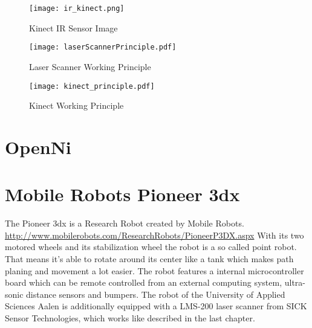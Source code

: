 \begin{figure}[htp]
	\centering
	\texttt{[image: ir\_kinect.png]}
	\caption{Kinect IR Sensor Image}
	\label{figure:kinect_ir}
\end{figure}

\begin{figure}[htp]
	\centering
	\texttt{[image: laserScannerPrinciple.pdf]}
	\caption{Laser Scanner Working Principle}
	\label{figure:ls_WP}
\end{figure}


\begin{figure}[htp]
	\centering
	\texttt{[image: kinect\_principle.pdf]}
	\caption{Kinect Working Principle}
	\label{figure:kinect_WP} 
\end{figure}
\clearpage

\section{OpenNi}



\section{Mobile Robots Pioneer 3dx}
The Pioneer 3dx is a Research Robot created by Mobile Robots.\\
\url{http://www.mobilerobots.com/ResearchRobots/PioneerP3DX.aspx}
With its two motored wheels and its stabilization wheel the robot is a so called point robot. That means it's able to 
rotate around its center like a tank which makes path planing and movement a lot easier. 
The robot features a internal microcontroller board which can be remote controlled from an external computing system, 
ultra-sonic distance sensors and bumpers. The robot of the University of Applied Sciences Aalen 
is additionally equipped with a LMS-200 laser scanner from SICK Sensor Technologies, which works
like described in the last chapter.







 

 
